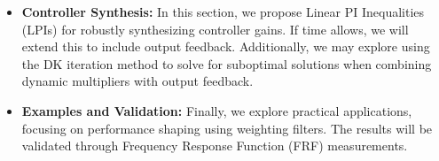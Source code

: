 \begin{itemize}
	\item \textbf{Controller Synthesis:} In this section, we propose Linear PI Inequalities (LPIs) for robustly synthesizing controller gains. If time allows, we will extend this to include output feedback. Additionally, we may explore using the DK iteration method to solve for suboptimal solutions when combining dynamic multipliers with output feedback.

	\item \textbf{Examples and Validation:} Finally, we explore practical applications, focusing on performance shaping using weighting filters. The results will be validated through Frequency Response Function (FRF) measurements.
\end{itemize}